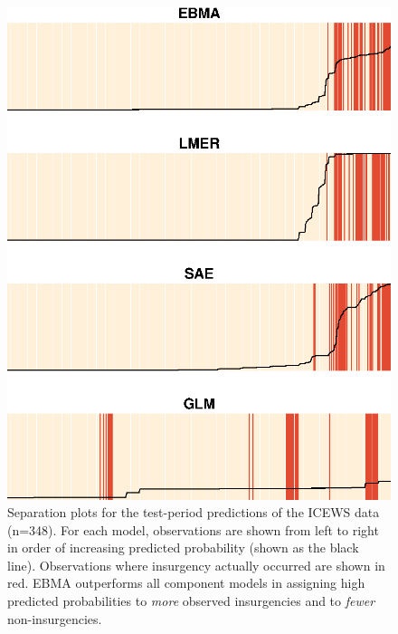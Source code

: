 \documentclass[12pt,fullpage,endnotes]{article}
\begin{document}
\begin{figure}
 \caption{\footnotesize Separation plots for the test-period
    predictions of the ICEWS data (n=348).  For each model,
    observations are shown from left to right in order of increasing
    predicted probability (shown as the black line).  Observations
    where insurgency actually occurred are shown in red.  EBMA
    outperforms all component models in assigning high predicted
    probabilities to \textit{more} observed insurgencies and to
    \textit{fewer} non-insurgencies.}
\label{OutSam1sep}
\begin{center}
\includegraphics{Outsample}
\end{center}
\end{figure}
\end{document}
